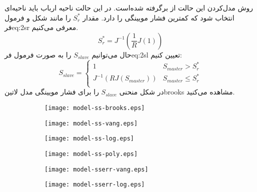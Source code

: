 روش مدل‌کردن این حالت از  برگرفته شده‌است. در این حالت ناحیه ارباب باید ناحیه‌ای انتخاب شود که کمترین فشار مویینگی را دارد. مقدار $S^*_r$ را مانند شکل  و فرمول ‌فر{eq:2sr} معرفی می‌کنیم.
\begin{equation}
\label{eq:2sr}
S_r^* = J^{-1}(\frac{1}{R}J(1))
\end{equation} 
حال می‌توانیم $S_{slave}$ را به صورت فرمول ‌فر{eq:2sl} تعیین کنیم:
\begin{equation}
\label{eq:2sscd}
S_{slave} =
\begin{cases}
1 &S_{master} > S_r^* \\
J^{-1}(RJ(S_{master})) &S_{master} \leq S_r^* \\
\end{cases}
\end{equation} 
در شکل  منحنی $S_{slave}$ را برای فشار مویینگی مدل ‌لاتین{brooks} مشاهده می‌کنید.
\begin{figure}
\begin{subfigure}{0.5\textwidth}
\texttt{[image: model-ss-brooks.eps]} 
\label{fig:2ss-brooks}
\end{subfigure}
\begin{subfigure}{0.5\textwidth}
\texttt{[image: model-ss-vang.eps]} 
\label{fig:2ss-vang}
\end{subfigure}
\begin{subfigure}{0.5\textwidth}
\texttt{[image: model-ss-log.eps]} 
\label{fig:2ss-log}
\end{subfigure}
\begin{subfigure}{0.5\textwidth}
\texttt{[image: model-ss-poly.eps]} 
\label{fig:2ss-poly}
\end{subfigure}
\label{fig:2ss}
\end{figure}
%
\begin{figure}
\begin{subfigure}{0.5\textwidth}
\texttt{[image: model-sserr-vang.eps]} 
\label{fig:2err-vang}
\end{subfigure}
\begin{subfigure}{0.5\textwidth}
\texttt{[image: model-sserr-log.eps]} 
\label{fig:2err-log}
\end{subfigure}

\label{fig:2err}
\end{figure}
